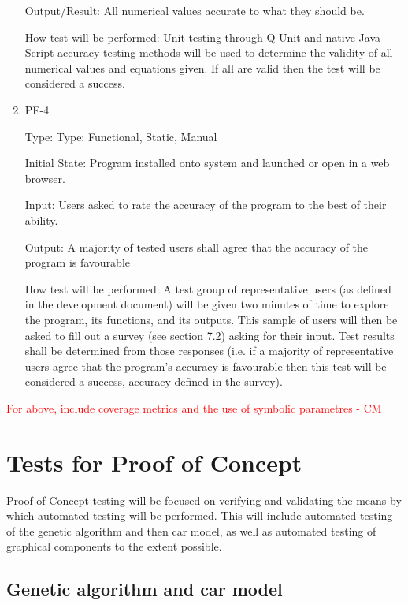 \documentclass[12pt, titlepage]{article}
\begin{document}
\begin{enumerate}
Output/Result: All numerical values accurate to what they should be.
					
How test will be performed: Unit testing through Q-Unit and native Java Script 
accuracy testing methods will be used to determine the validity of all numerical 
values and equations given. If all are valid then the test will be considered a 
success.


\item{PF-4\\}

Type: Type: Functional, Static, Manual
					
Initial State: Program installed onto system and launched or open in a web 
browser.
					
Input: Users asked to rate the accuracy of the program to the best of their 
ability.
					
Output: A majority of tested users shall agree that the accuracy of the program 
is favourable
					
 How test will be performed: A test group of representative users (as defined in 
the development document) will be given two minutes of time to explore the 
program, its functions, and its outputs. This sample of users will then be asked 
to fill out a survey (see section 7.2) asking for their input. Test results 
shall be determined from those responses (i.e. if a majority of representative 
users agree that the program's accuracy is favourable then this test will be 
considered a success, accuracy defined in the survey).

\end{enumerate}
\textcolor{red}{For above, include coverage metrics and the use of symbolic parametres - CM} \\

\section{Tests for Proof of Concept}

Proof of Concept testing will be focused on verifying and validating the means 
by which automated testing will be performed. This will include automated 
testing of the genetic algorithm and then car model, as well as automated 
testing of graphical components to the extent possible.

\subsection{Genetic algorithm and car model}
\end{document}
